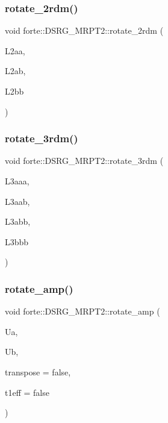 \subsubsection{\texorpdfstring{rotate\+\_\+2rdm()}{rotate\_2rdm()}}
{\footnotesize\ttfamily void forte\+::\+D\+S\+R\+G\+\_\+\+M\+R\+P\+T2\+::rotate\+\_\+2rdm (\begin{DoxyParamCaption}\item[{ambit\+::\+Tensor \&}]{L2aa,  }\item[{ambit\+::\+Tensor \&}]{L2ab,  }\item[{ambit\+::\+Tensor \&}]{L2bb }\end{DoxyParamCaption})\hspace{0.3cm}{\ttfamily [protected]}}

\mbox{\label{classforte_1_1_d_s_r_g___m_r_p_t2_a9b5fed7e984e823cbe4e5f5f443d4497}} 
\subsubsection{\texorpdfstring{rotate\+\_\+3rdm()}{rotate\_3rdm()}}
{\footnotesize\ttfamily void forte\+::\+D\+S\+R\+G\+\_\+\+M\+R\+P\+T2\+::rotate\+\_\+3rdm (\begin{DoxyParamCaption}\item[{ambit\+::\+Tensor \&}]{L3aaa,  }\item[{ambit\+::\+Tensor \&}]{L3aab,  }\item[{ambit\+::\+Tensor \&}]{L3abb,  }\item[{ambit\+::\+Tensor \&}]{L3bbb }\end{DoxyParamCaption})\hspace{0.3cm}{\ttfamily [protected]}}

\mbox{\label{classforte_1_1_d_s_r_g___m_r_p_t2_a1c002fd10dc32ed7486e20f8b9cf7cbd}} 
\subsubsection{\texorpdfstring{rotate\+\_\+amp()}{rotate\_amp()}}
{\footnotesize\ttfamily void forte\+::\+D\+S\+R\+G\+\_\+\+M\+R\+P\+T2\+::rotate\+\_\+amp (\begin{DoxyParamCaption}\item[{psi\+::\+Shared\+Matrix}]{Ua,  }\item[{psi\+::\+Shared\+Matrix}]{Ub,  }\item[{const bool \&}]{transpose = {\ttfamily false},  }\item[{const bool \&}]{t1eff = {\ttfamily false} }\end{DoxyParamCaption})}

